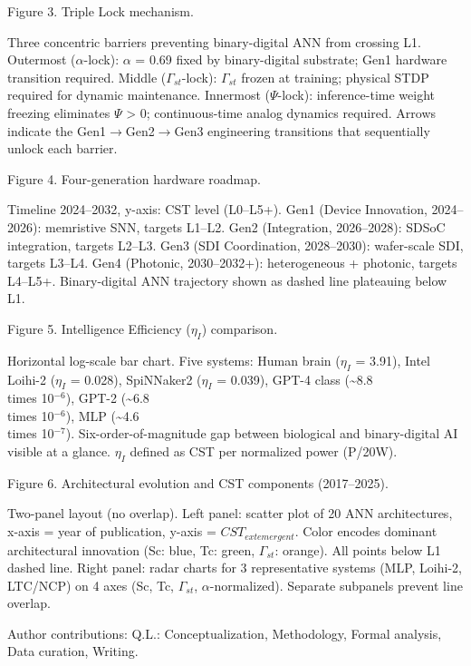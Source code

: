 \documentclass[a4paper,12pt]{article}
\begin{document}
Figure 3. Triple Lock mechanism.

Three concentric barriers preventing binary-digital ANN from crossing L1. Outermost ($\alpha$-lock): $\alpha$ = 0.69 fixed by binary-digital substrate; Gen1 hardware transition required. Middle ($\Gamma_{st}$-lock): $\Gamma_{st}$ frozen at training; physical STDP required for dynamic maintenance. Innermost ($\Psi$-lock): inference-time weight freezing eliminates $\Psi$ > 0; continuous-time analog dynamics required. Arrows indicate the Gen1$\rightarrow$Gen2$\rightarrow$Gen3 engineering transitions that sequentially unlock each barrier.

Figure 4. Four-generation hardware roadmap.

Timeline 2024--2032, y-axis: CST level (L0--L5+). Gen1 (Device Innovation, 2024--2026): memristive SNN, targets L1--L2. Gen2 (Integration, 2026--2028): SDSoC integration, targets L2--L3. Gen3 (SDI Coordination, 2028--2030): wafer-scale SDI, targets L3--L4. Gen4 (Photonic, 2030--2032+): heterogeneous + photonic, targets L4--L5+. Binary-digital ANN trajectory shown as dashed line plateauing below L1.

Figure 5. Intelligence Efficiency ($\eta_{I}$) comparison.

Horizontal log-scale bar chart. Five systems: Human brain ($\eta_{I}$ = 3.91), Intel Loihi-2 ($\eta_{I}$ = 0.028), SpiNNaker2 ($\eta_{I}$ = 0.039), GPT-4 class (\textasciitilde{}8.8 \\times 10$^{-6}$), GPT-2 (\textasciitilde{}6.8 \\times 10$^{-6}$), MLP (\textasciitilde{}4.6 \\times 10$^{-7}$). Six-order-of-magnitude gap between biological and binary-digital AI visible at a glance. $\eta_{I}$ defined as CST per normalized power (P/20W).

Figure 6. Architectural evolution and CST components (2017--2025).

Two-panel layout (no overlap). Left panel: scatter plot of 20 ANN architectures, x-axis = year of publication, y-axis = $CST_{	ext{emergent}}$. Color encodes dominant architectural innovation (Sc: blue, Tc: green, $\Gamma_{st}$: orange). All points below L1 dashed line. Right panel: radar charts for 3 representative systems (MLP, Loihi-2, LTC/NCP) on 4 axes (Sc, Tc, $\Gamma_{st}$, $\alpha$-normalized). Separate subpanels prevent line overlap.

Author contributions: Q.L.: Conceptualization, Methodology, Formal analysis, Data curation, Writing.
\end{document}
